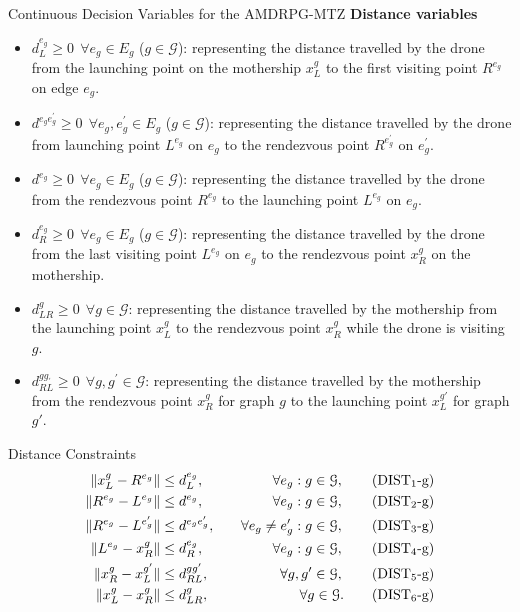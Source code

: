 \documentclass[slidestop,usepdftitle=false,10pt]{beamer}
\begin{document}
    \begin{frame}{Continuous Decision Variables for the AMDRPG-MTZ}
    \textbf{Distance variables}
    \begin{itemize}
        \footnotesize
        \item $d_L^{e_g} \geq 0 \:\: \forall e_g \in E_g$ ($g \in \mathcal{G}$): representing the distance travelled by the drone from the launching point 
         on the mothership  $x_L^g$ to the first visiting point $R^{e_g}$ on edge $e_g$.
        \item $d^{e_ge^\prime_g} \geq 0 \:\: \forall e_g, e^\prime_g \in E_g $ ($g \in \mathcal{G}$): representing the distance travelled by the drone from launching point $L^{e_g}$ on $e_g$ to the rendezvous point $R^{e^\prime_g}$ on $e^\prime_g$.
        \item $d^{e_g} \geq 0 \:\: \forall e_g \in E_g$ ($g \in \mathcal{G}$): representing the distance travelled by the drone from the rendezvous point
$R^{e_g}$ to the launching point $L^{e_g}$ on $e_g$. 
        \item $d_R^{e_g} \geq 0 \:\: \forall e_g \in E_g$ ($g \in \mathcal{G}$): representing the distance travelled by the drone from the last visiting point
 $L^{e_g}$ on $e_g$ to the rendezvous point $x_R^g$ on the mothership.
        \item $d_{LR}^g \geq 0 \:\: \forall g \in \mathcal{G}$: representing the distance travelled by the mothership from the launching point
 $x_L^g$ to the rendezvous point $x_R^g$ while the drone is visiting $g$.
        \item $d_{RL}^{gg_\prime} \geq 0 \:\: \forall g, g^{'} \in \mathcal{G}$: representing the distance travelled by the mothership from the 
rendezvous point $x_R^g$ for graph $g$ to the launching point $x_L^{g\prime}$ for graph $g\prime$.
    \end{itemize}
	\end{frame}
	
	\begin{frame}{Distance Constraints}
	    \begin{align*}
        \|x_L^g- R^{e_g}\| &\leq d_L^{e_g},&\quad \forall e_g:g\in\mathcal G, \tag{DIST$_{1}$-g} \label{eq:d1g}\\
        \|R^{e_g}- L^{e_g}\| &\leq d^{e_g},&\quad \forall e_g:g\in\mathcal G, \tag{DIST$_{2}$-g}\\
        \|R^{e_g}- L^{e^\prime_g}\| &\leq d^{e_ge^\prime_g},&\quad \forall e_g\neq e'_g:g\in\mathcal G, \tag{DIST$_{3}$-g}\\
         \|L^{e_g}- x_R^g\| &\leq d_R^{e_g},&\quad \forall e_g:g\in\mathcal G, \tag{DIST$_{4}$-g}\\
        \|x_R^g- x_L^{g'}\| &\leq d^{gg'}_{RL},& \quad \forall g,g'\in\mathcal G, \tag{DIST$_{5}$-g}\\
        \|x_L^g- x_R^g\| &\leq d^g_{LR},& \quad \forall g\in\mathcal G. \tag{DIST$_{6}$-g} \label{eq:d6g}\\
        \end{align*}
	\end{frame}
	
\end{document}

